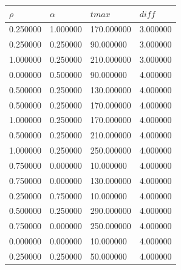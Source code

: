 \documentclass[12pt]{report}
\begin{document}
\begin{table}[h!]
	\begin{center}
		\begin{tabular}{|llll|}
			\hline
			\multicolumn{1}{|l|}{$\rho$}      & \multicolumn{1}{l|}{$\alpha$} & \multicolumn{1}{l|}{$tmax$} & $diff$     \\ \hline
			\multicolumn{1}{|c}{0.250000} & 1.000000                   & 170.000000                & 3.000000 \\
			0.250000                      & 0.250000                   & 90.000000                 & 3.000000 \\
			1.000000                      & 0.250000                   & 210.000000                & 3.000000 \\
			0.000000                      & 0.500000                   & 90.000000                 & 4.000000 \\
			0.500000                      & 0.250000                   & 130.000000                & 4.000000 \\
			0.500000                      & 0.250000                   & 170.000000                & 4.000000 \\
			1.000000                      & 0.250000                   & 170.000000                & 4.000000 \\
			0.500000                      & 0.250000                   & 210.000000                & 4.000000 \\
			1.000000                      & 0.250000                   & 250.000000                & 4.000000 \\
			0.750000                      & 0.000000                   & 10.000000                 & 4.000000 \\
			0.750000                      & 0.000000                   & 130.000000                & 4.000000 \\
			0.250000                      & 0.750000                   & 10.000000                 & 4.000000 \\
			0.500000                      & 0.250000                   & 290.000000                & 4.000000 \\
			0.750000                      & 0.000000                   & 250.000000                & 4.000000 \\
			0.000000                      & 0.000000                   & 10.000000                 & 4.000000 \\
			0.250000                      & 0.250000                   & 50.000000                 & 4.000000 \\

\end{tabular}
\end{center}
\end{table}
\end{document}
